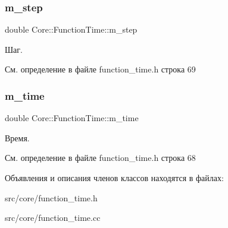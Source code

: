 \subsubsection{\texorpdfstring{m\+\_\+step}{m\_step}}
{\footnotesize\ttfamily double Core\+::\+Function\+Time\+::m\+\_\+step\hspace{0.3cm}{\ttfamily [protected]}}

Шаг. 

См. определение в файле function\+\_\+time.\+h строка 69

\hypertarget{class_core_1_1_function_time_a12192d0047976f9cd6376e986e43451c}{}\label{class_core_1_1_function_time_a12192d0047976f9cd6376e986e43451c} 
\subsubsection{\texorpdfstring{m\+\_\+time}{m\_time}}
{\footnotesize\ttfamily double Core\+::\+Function\+Time\+::m\+\_\+time\hspace{0.3cm}{\ttfamily [protected]}}

Время. 

См. определение в файле function\+\_\+time.\+h строка 68



Объявления и описания членов классов находятся в файлах\+:\begin{DoxyCompactItemize}
\item 
src/core/function\+\_\+time.\+h\item 
src/core/function\+\_\+time.\+cc\end{DoxyCompactItemize}
